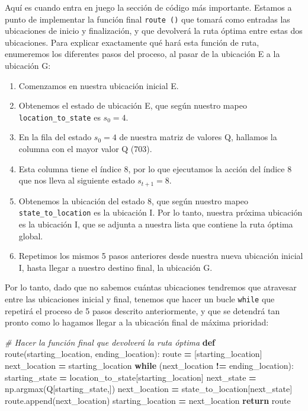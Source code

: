 \documentclass[
]{book}
\newenvironment{Shaded}{\begin{snugshade}}{\end{snugshade}}
\newcommand{\CommentTok}[1]{\textcolor[rgb]{0.56,0.35,0.01}{\textit{#1}}}
\newcommand{\ControlFlowTok}[1]{\textcolor[rgb]{0.13,0.29,0.53}{\textbf{#1}}}
\newcommand{\KeywordTok}[1]{\textcolor[rgb]{0.13,0.29,0.53}{\textbf{#1}}}
\newcommand{\NormalTok}[1]{#1}
\newcommand{\OperatorTok}[1]{\textcolor[rgb]{0.81,0.36,0.00}{\textbf{#1}}}
\providecommand{\tightlist}{%
  \setlength{\itemsep}{0pt}\setlength{\parskip}{0pt}}
\begin{document}
Aquí es cuando entra en juego la sección de código más importante. Estamos a punto de implementar la función final \texttt{route\ ()} que tomará como entradas las ubicaciones de inicio y finalización, y que devolverá la ruta óptima entre estas dos ubicaciones. Para explicar exactamente qué hará esta función de ruta, enumeremos los diferentes pasos del proceso, al pasar de la ubicación E a la ubicación G:

\begin{enumerate}
\def\labelenumi{\arabic{enumi}.}
\tightlist
\item
  Comenzamos en nuestra ubicación inicial E.
\item
  Obtenemos el estado de ubicación E, que según nuestro mapeo \texttt{location\_to\_state} es \(s_0 = 4\).
\item
  En la fila del estado \(s_0 = 4\) de nuestra matriz de valores Q, hallamos la columna con el mayor valor Q (703).
\item
  Esta columna tiene el índice 8, por lo que ejecutamos la acción del índice 8 que nos lleva al siguiente estado \(s_{t+1} = 8\).
\item
  Obtenemos la ubicación del estado 8, que según nuestro mapeo \texttt{state\_to\_location} es la ubicación I. Por lo tanto, nuestra próxima ubicación es la ubicación I, que se adjunta a nuestra lista que contiene la ruta óptima global.
\item
  Repetimos los mismos 5 pasos anteriores desde nuestra nueva ubicación inicial I, hasta llegar a nuestro destino final, la ubicación G.
\end{enumerate}

Por lo tanto, dado que no sabemos cuántas ubicaciones tendremos que atravesar entre las ubicaciones inicial y final, tenemos que hacer un bucle \texttt{while} que repetirá el proceso de 5 pasos descrito anteriormente, y que se detendrá tan pronto como lo hagamos llegar a la ubicación final de máxima prioridad:

\begin{Shaded}
\begin{Highlighting}[]
\CommentTok{\# Hacer la función final que devolverá la ruta óptima}
\KeywordTok{def}\NormalTok{ route(starting\_location, ending\_location):}
\NormalTok{    route }\OperatorTok{=}\NormalTok{ [starting\_location]}
\NormalTok{    next\_location }\OperatorTok{=}\NormalTok{ starting\_location}
    \ControlFlowTok{while}\NormalTok{ (next\_location }\OperatorTok{!=}\NormalTok{ ending\_location):}
\NormalTok{        starting\_state }\OperatorTok{=}\NormalTok{ location\_to\_state[starting\_location]}
\NormalTok{        next\_state }\OperatorTok{=}\NormalTok{ np.argmax(Q[starting\_state,])}
\NormalTok{        next\_location }\OperatorTok{=}\NormalTok{ state\_to\_location[next\_state]}
\NormalTok{        route.append(next\_location)}
\NormalTok{        starting\_location }\OperatorTok{=}\NormalTok{ next\_location}
    \ControlFlowTok{return}\NormalTok{ route}
\end{Highlighting}
\end{Shaded}
\end{document}
